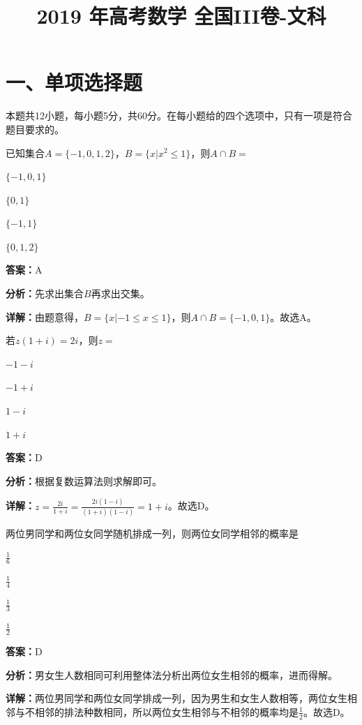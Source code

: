 ﻿\title{2019 年高考数学 全国III卷-文科}
\date{}
\maketitle

\section*{一、单项选择题}
本题共12小题，每小题5分，共60分。在每小题给的四个选项中，只有一项是符合题目要求的。

\begin{question}[points=5]
已知集合$A=\{-1,0,1,2\}$，$B=\{x|x^2\le 1\}$，则$A\cap B=$
\begin{choices}
  \item $\{-1,0,1\}$
  \item $\{0,1\}$
  \item $\{-1,1\}$
  \item $\{0,1,2\}$
\end{choices}
\begin{solution}
\textbf{答案：}A

\textbf{分析：}先求出集合$B$再求出交集。

\textbf{详解：}由题意得，$B=\{x|-1\le x\le 1\}$，则$A\cap B=\{-1,0,1\}$。故选A。
\end{solution}
\end{question}

\begin{question}[points=5]
若$z(1+i)=2i$，则$z=$
\begin{choices}
  \item $-1-i$
  \item $-1+i$
  \item $1-i$
  \item $1+i$
\end{choices}
\begin{solution}
\textbf{答案：}D

\textbf{分析：}根据复数运算法则求解即可。

\textbf{详解：}$z=\frac{2i}{1+i}=\frac{2i(1-i)}{(1+i)(1-i)}=1+i$。故选D。
\end{solution}
\end{question}

\begin{question}[points=5]
两位男同学和两位女同学随机排成一列，则两位女同学相邻的概率是
\begin{choices}
  \item $\frac{1}{6}$
  \item $\frac{1}{4}$
  \item $\frac{1}{3}$
  \item $\frac{1}{2}$
\end{choices}
\begin{solution}
\textbf{答案：}D

\textbf{分析：}男女生人数相同可利用整体法分析出两位女生相邻的概率，进而得解。

\textbf{详解：}两位男同学和两位女同学排成一列，因为男生和女生人数相等，两位女生相邻与不相邻的排法种数相同，所以两位女生相邻与不相邻的概率均是$\frac{1}{2}$。故选D。
\end{solution}
\end{question}


